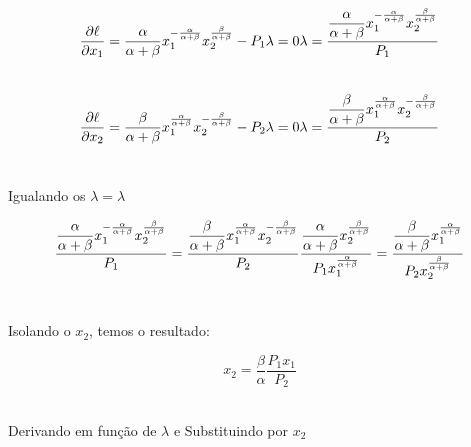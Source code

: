 \documentclass[a4paper, 12pt]{article} %
\begin{document}
\begin{flushleft}
		\begin{equation}
			\frac{\partial\ell}{\partial x_{1}} = \dfrac{\alpha}{\alpha + \beta}x_{1}^{-\frac{\alpha}{\alpha + \beta}} x_{2}^{\frac{\beta}{\alpha + \beta}} - P_{1}\lambda = 0 $$\\$$
			\lambda = \dfrac{\dfrac{\alpha}{\alpha + \beta}x_{1}^{-\frac{\alpha}{\alpha + \beta}} x_{2}^{\frac{\beta}{\alpha + \beta}}}{P_{1}}
		\end{equation}
\\
		\begin{equation}
		\frac{\partial\ell}{\partial x_{2}} = \dfrac{\beta}{\alpha + \beta}x_{1}^{\frac{\alpha}{\alpha + \beta}} x_{2}^{-\frac{\beta}{\alpha + \beta}} - P_{2}\lambda = 0 
		$$\\$$
		\lambda = \dfrac{\dfrac{\beta}{\alpha + \beta}x_{1}^{\frac{\alpha}{\alpha + \beta}} x_{2}^{-\frac{\beta}{\alpha + \beta}}}{P_{2}}
		\end{equation}
\\
\begin{center}
	Igualando os $\lambda = \lambda$ \\
\end{center}
		\begin{equation}
		\dfrac{\dfrac{\alpha}{\alpha + \beta}x_{1}^{-\frac{\alpha}{\alpha + \beta}} x_{2}^{\frac{\beta}{\alpha + \beta}}}{P_{1}} = \dfrac{\dfrac{\beta}{\alpha + \beta}x_{1}^{\frac{\alpha}{\alpha + \beta}} x_{2}^{-\frac{\beta}{\alpha + \beta}}}{P_{2}} 
		$$\\$$
		\dfrac{\dfrac{\alpha}{\alpha + \beta} x_{2}^{\frac{\beta}{\alpha + \beta}}}{P_{1}x_{1}^{\frac{\alpha}{\alpha + \beta}}} = \dfrac{\dfrac{\beta}{\alpha + \beta} x_{1}^{\frac{\alpha}{\alpha + \beta}}}{P_{2}x_{2}^{\frac{\beta}{\alpha + \beta}}}
		\end{equation}
\\

	\begin{center}
	Isolando o $x_{2}$, temos o resultado:
	\end{center}

	\begin{equation}
		x_{2} = \dfrac{\beta}{\alpha}\dfrac{P_{1}x_{1}}{P_{2}}
	\end{equation}
\\

	\begin{center}
		Derivando em função de $\lambda$ e Substituindo por $x_{2}$ \\
	\end{center}


\end{flushleft}
\end{document}
